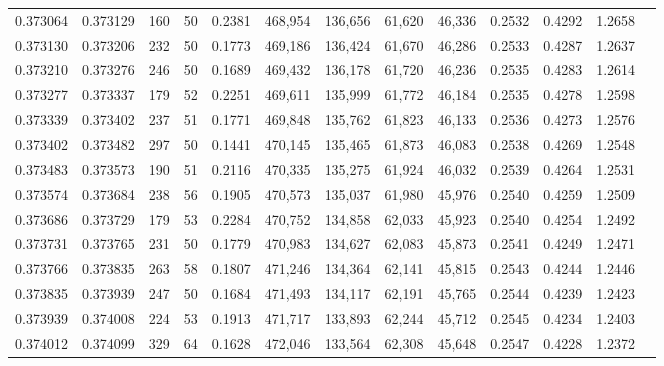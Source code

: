 \begin{tabular}{rrrrrrrrrrrrr}
0.373064 & 0.373129 &   160 &  50 &                                     0.2381 & 468,954 & 136,656 &  61,620 &  46,336 & 0.2532 & 0.4292 & 1.2658 \\
0.373130 & 0.373206 &   232 &  50 &                                     0.1773 & 469,186 & 136,424 &  61,670 &  46,286 & 0.2533 & 0.4287 & 1.2637 \\
0.373210 & 0.373276 &   246 &  50 &                                     0.1689 & 469,432 & 136,178 &  61,720 &  46,236 & 0.2535 & 0.4283 & 1.2614 \\
0.373277 & 0.373337 &   179 &  52 &                                     0.2251 & 469,611 & 135,999 &  61,772 &  46,184 & 0.2535 & 0.4278 & 1.2598 \\
0.373339 & 0.373402 &   237 &  51 &                                     0.1771 & 469,848 & 135,762 &  61,823 &  46,133 & 0.2536 & 0.4273 & 1.2576 \\
0.373402 & 0.373482 &   297 &  50 &                                     0.1441 & 470,145 & 135,465 &  61,873 &  46,083 & 0.2538 & 0.4269 & 1.2548 \\
0.373483 & 0.373573 &   190 &  51 &                                     0.2116 & 470,335 & 135,275 &  61,924 &  46,032 & 0.2539 & 0.4264 & 1.2531 \\
0.373574 & 0.373684 &   238 &  56 &                                     0.1905 & 470,573 & 135,037 &  61,980 &  45,976 & 0.2540 & 0.4259 & 1.2509 \\
0.373686 & 0.373729 &   179 &  53 &                                     0.2284 & 470,752 & 134,858 &  62,033 &  45,923 & 0.2540 & 0.4254 & 1.2492 \\
0.373731 & 0.373765 &   231 &  50 &                                     0.1779 & 470,983 & 134,627 &  62,083 &  45,873 & 0.2541 & 0.4249 & 1.2471 \\
0.373766 & 0.373835 &   263 &  58 &                                     0.1807 & 471,246 & 134,364 &  62,141 &  45,815 & 0.2543 & 0.4244 & 1.2446 \\
0.373835 & 0.373939 &   247 &  50 &                                     0.1684 & 471,493 & 134,117 &  62,191 &  45,765 & 0.2544 & 0.4239 & 1.2423 \\
0.373939 & 0.374008 &   224 &  53 &                                     0.1913 & 471,717 & 133,893 &  62,244 &  45,712 & 0.2545 & 0.4234 & 1.2403 \\
0.374012 & 0.374099 &   329 &  64 &                                     0.1628 & 472,046 & 133,564 &  62,308 &  45,648 & 0.2547 & 0.4228 & 1.2372 \\

\end{tabular}
